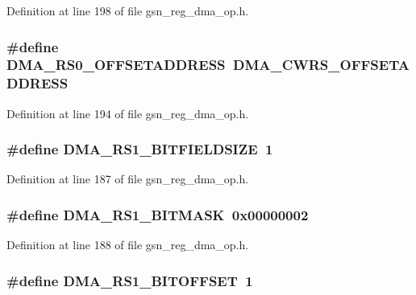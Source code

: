 Definition at line 198 of file gsn\_\-reg\_\-dma\_\-op.h.

\hypertarget{a00547_acb14db5c688af99267d8520a441073e3}{
\subsubsection[{DMA\_\-RS0\_\-OFFSETADDRESS}]{\setlength{\rightskip}{0pt plus 5cm}\#define DMA\_\-RS0\_\-OFFSETADDRESS~DMA\_\-CWRS\_\-OFFSETADDRESS}}
\label{a00547_acb14db5c688af99267d8520a441073e3}


Definition at line 194 of file gsn\_\-reg\_\-dma\_\-op.h.

\hypertarget{a00547_a0ac6f5b050444b2a00967ea6a51db34c}{
\subsubsection[{DMA\_\-RS1\_\-BITFIELDSIZE}]{\setlength{\rightskip}{0pt plus 5cm}\#define DMA\_\-RS1\_\-BITFIELDSIZE~1}}
\label{a00547_a0ac6f5b050444b2a00967ea6a51db34c}


Definition at line 187 of file gsn\_\-reg\_\-dma\_\-op.h.

\hypertarget{a00547_ab504fb006839c4a9e67dc144ec32efff}{
\subsubsection[{DMA\_\-RS1\_\-BITMASK}]{\setlength{\rightskip}{0pt plus 5cm}\#define DMA\_\-RS1\_\-BITMASK~0x00000002}}
\label{a00547_ab504fb006839c4a9e67dc144ec32efff}


Definition at line 188 of file gsn\_\-reg\_\-dma\_\-op.h.

\hypertarget{a00547_ab3cecf007e51d2a7735c33e9021d9f92}{
\subsubsection[{DMA\_\-RS1\_\-BITOFFSET}]{\setlength{\rightskip}{0pt plus 5cm}\#define DMA\_\-RS1\_\-BITOFFSET~1}}
\label{a00547_ab3cecf007e51d2a7735c33e9021d9f92}


